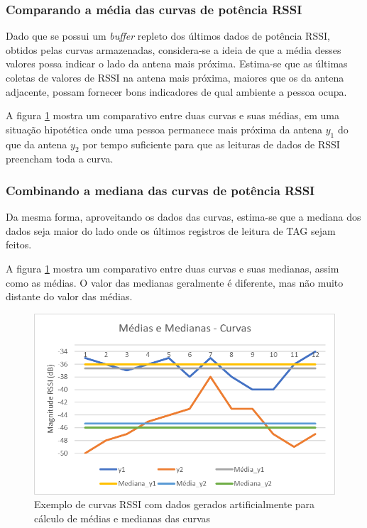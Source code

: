 \subsubsection{Comparando a média das curvas de potência RSSI} \label{section:mean_met}

 Dado que se possui um \textit{buffer} repleto dos últimos dados de potência RSSI, obtidos pelas curvas armazenadas, considera-se a ideia de que a média desses valores possa indicar o lado da antena mais próxima. Estima-se que as últimas coletas de valores de RSSI na antena mais próxima, maiores que os da antena adjacente, possam fornecer bons indicadores de qual ambiente a pessoa ocupa.
 
 A figura \ref{fig:mediamediana_met} mostra um comparativo entre duas curvas e suas médias, em uma situação hipotética onde uma pessoa permanece mais próxima da antena $y_1$ do que da antena $y_2$ por tempo suficiente para que as leituras de dados de RSSI preencham toda a curva.

\subsubsection{Combinando a mediana das curvas de potência RSSI} \label{section:median_met}
 
 Da mesma forma, aproveitando os dados das curvas, estima-se que a mediana dos dados seja maior do lado onde os últimos registros de leitura de TAG sejam feitos.
 
  A figura \ref{fig:mediamediana_met} mostra um comparativo entre duas curvas e suas medianas, assim como as médias. O valor das medianas geralmente é diferente, mas não muito distante do valor das médias.

   \begin{figure}[H]
    \centering
    \includegraphics[width=0.8\linewidth]{figs/Metodologia/mediamediana.png}
    \caption{Exemplo de curvas RSSI com dados gerados artificialmente para cálculo de médias e medianas das curvas}
    \label{fig:mediamediana_met}
\end{figure}
 

